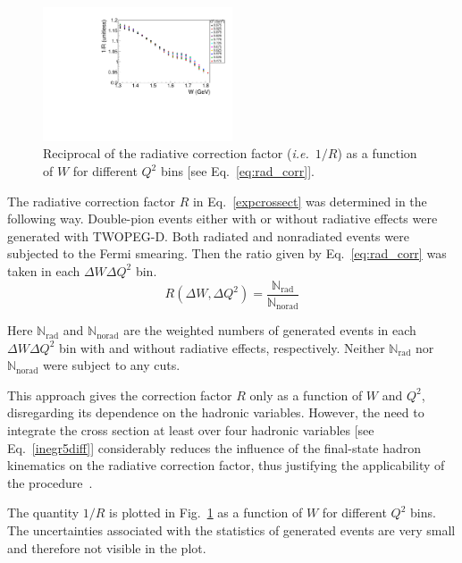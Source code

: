 \documentclass[prc,twocolumn,superscriptaddress,showpacs,amssymb,amsmath,amsfonts,aps,nofootinbib]{revtex4-1}
\begin{document}
\begin{figure}[htp]
\begin{center}
\includegraphics[width=0.5\textwidth]{pictures/corrections/radcorr.pdf}
\caption{\small Reciprocal of the radiative correction factor ({\it i.e.}~$1/R$) as a function of $W$ for different $Q^{2}$ bins [see Eq.\!~\eqref{eq:rad_corr}].} \label{fig:radcorr}
\end{center}
\end{figure}

The radiative correction factor $R$ in Eq.\!~\eqref{expcrossect} was determined in the following way. Double-pion events either with or without radiative effects were generated with TWOPEG-D. Both radiated and nonradiated events were subjected to the Fermi smearing. Then the ratio given by Eq.\!~\eqref{eq:rad_corr} was taken in each $\Delta W \Delta Q^{2}$ bin.
\begin{equation}
R(\Delta W, \Delta Q^{2}) = \frac{\mathbb{N}_{\text{rad}}}{\mathbb{N}_{\text{norad}}}
\label{eq:rad_corr}
\end{equation}

Here $\mathbb{N}_{\text{rad}}$ and $\mathbb{N}_{\text{norad}}$ are the weighted numbers of generated events in each $\Delta W \Delta Q^{2}$ bin with and without radiative effects, respectively. Neither $\mathbb{N}_{\text{rad}}$ nor $\mathbb{N}_{\text{norad}}$ were subject to any cuts.


This approach gives the correction factor $R$ only as a function of $W$ and $Q^{2}$, disregarding its dependence on the hadronic variables. However, the need to integrate the cross section at least over four hadronic variables [see Eq.\!~\eqref{inegr5diff}] considerably reduces the influence of the final-state hadron kinematics on the radiative correction factor, thus justifying the applicability of the procedure~\cite{Mo:1968cg,twopeg,twopeg-d}.

The quantity $1/R$ is plotted in Fig.\!~\ref{fig:radcorr} as a function of $W$ for different $Q^{2}$ bins. The uncertainties associated with the statistics of generated events are very small and therefore not visible in the plot.
\end{document}
